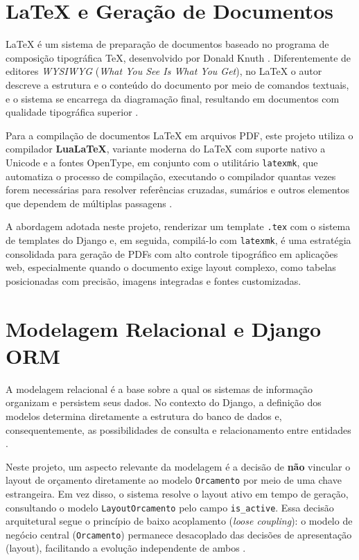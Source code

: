 \section{LaTeX e Geração de Documentos}
\label{sec:latex}

LaTeX é um sistema de preparação de documentos baseado no programa de composição tipográfica TeX,
desenvolvido por Donald Knuth \cite{knuth1984}. Diferentemente de editores \textit{WYSIWYG}
(\textit{What You See Is What You Get}), no LaTeX o autor descreve a estrutura e o conteúdo do documento
por meio de comandos textuais, e o sistema se encarrega da diagramação final, resultando em documentos
com qualidade tipográfica superior \cite{lamport1994}.

Para a compilação de documentos LaTeX em arquivos PDF, este projeto utiliza o compilador
\textbf{LuaLaTeX}, variante moderna do LaTeX com suporte nativo a Unicode e a fontes OpenType, em
conjunto com o utilitário \texttt{latexmk}, que automatiza o processo de compilação, executando o
compilador quantas vezes forem necessárias para resolver referências cruzadas, sumários e outros
elementos que dependem de múltiplas passagens \cite{latex2023}.

A abordagem adotada neste projeto, renderizar um template \texttt{.tex} com o sistema de templates do
Django e, em seguida, compilá-lo com \texttt{latexmk}, é uma estratégia consolidada para geração de
PDFs com alto controle tipográfico em aplicações web, especialmente quando o documento exige layout
complexo, como tabelas posicionadas com precisão, imagens integradas e fontes customizadas.

\section{Modelagem Relacional e Django ORM}
\label{sec:modelagem-relacional}

A modelagem relacional é a base sobre a qual os sistemas de informação organizam e persistem seus dados.
No contexto do Django, a definição dos modelos determina diretamente a estrutura do banco de dados e,
consequentemente, as possibilidades de consulta e relacionamento entre entidades \cite{elmasri2011}.

Neste projeto, um aspecto relevante da modelagem é a decisão de \textbf{não} vincular o layout de
orçamento diretamente ao modelo \texttt{Orcamento} por meio de uma chave estrangeira. Em vez disso, o
sistema resolve o layout ativo em tempo de geração, consultando o modelo \texttt{LayoutOrcamento} pelo
campo \texttt{is\_active}. Essa decisão arquitetural segue o princípio de baixo acoplamento
(\textit{loose coupling}): o modelo de negócio central (\texttt{Orcamento}) permanece desacoplado das
decisões de apresentação (layout), facilitando a evolução independente de ambos \cite{martin2002}.

